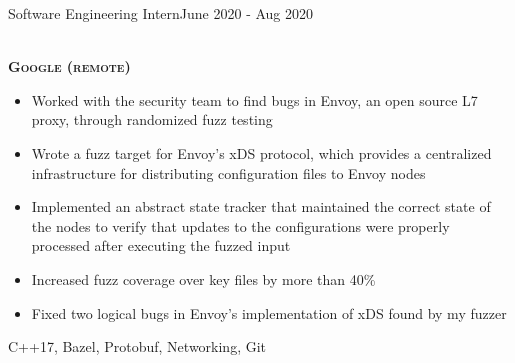 %
%
%

\begin{projects}

    \project
	{Software Engineering Intern}{June 2020 - Aug 2020}
	{
		\\ \textbf{\textsc{Google (remote)}}
	    \begin{itemize}
			\item Worked with the security team to find bugs in Envoy, an open source L7 proxy, through randomized fuzz testing
			\item Wrote a fuzz target for Envoy's xDS protocol, which provides a centralized infrastructure for distributing configuration files to Envoy nodes
			\item Implemented an abstract state tracker that maintained the correct state of the nodes to verify that updates to the configurations were properly processed after executing the fuzzed input
			\item Increased fuzz coverage over key files by more than 40\%
			\item Fixed two logical bugs in Envoy's implementation of xDS found by my fuzzer
        \end{itemize}
    }
	{C++17, Bazel, Protobuf, Networking, Git} \\

\end{projects}
